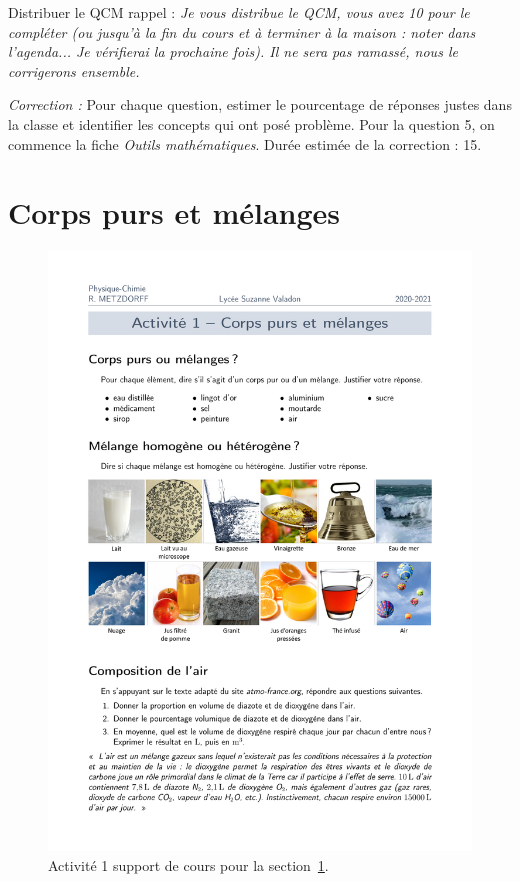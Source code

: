 \begin{prior}
Distribuer le QCM rappel :
\emph{Je vous distribue le QCM, vous avez \unit{10}{\minute} pour le compléter (ou jusqu'à la fin du cours et à terminer à la maison : noter dans l'agenda... Je vérifierai la prochaine fois).
Il ne sera pas ramassé, nous le corrigerons ensemble.}

\noindent
\emph{Correction :}
Pour chaque question, estimer le pourcentage de réponses justes dans la classe et identifier les concepts qui ont posé problème.
Pour la question 5, on commence la fiche \emph{Outils mathématiques}.
Durée estimée de la correction : \unit{15}{\minute}.
\end{prior}

\section{Corps purs et mélanges}
\label{sec:corps_purs_melanges}

\begin{figure}[h]
\center
\includegraphics[scale=0.5]{chap1_act1.pdf}
\caption{Activité 1 support de cours pour la section~\ref{sec:corps_purs_melanges}.}
\end{figure}

